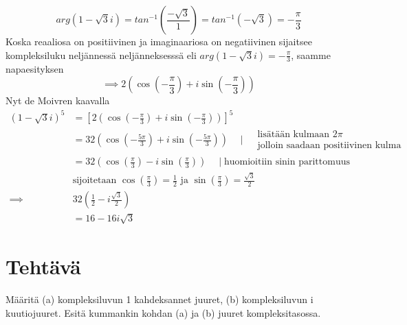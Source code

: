 \documentclass{article}
\newcounter{tehtava}
\begin{document}
\[
    arg(1 - \sqrt{3}i) = tan^{-1}\left(\frac{-\sqrt{3}}{1} \right) = tan^{-1}\left(-\sqrt{3} \right) = - \frac{\pi}{3}
\]
Koska reaaliosa on positiivinen ja imaginaariosa on negatiivinen sijaitsee kompleksiluku neljännessä neljänneksesssä eli $arg(1 - \sqrt{3}i) = - \frac{\pi}{3}$, saamme napaesityksen
\[
    \implies 2 \left( \cos\left( -\frac{\pi}{3} \right) + i \sin\left( -\frac{\pi}{3} \right) \right)
\]
Nyt de Moivren kaavalla
\[
\begin{aligned}
    (1 - \sqrt{3}i)^5 &= \left[2 \left( \cos\left( -\frac{\pi}{3} \right) + i \sin\left( -\frac{\pi}{3} \right) \right)\right]^5 \\
    &=32 \left( \cos\left( -\frac{5\pi}{3} \right) + i \sin\left( -\frac{5\pi}{3} \right) \right) \quad \mid \begin{aligned} &\text{lisätään kulmaan }2\pi \\&\text{jolloin saadaan positiivinen kulma} \end{aligned} \\
    &=32 \left( \cos\left( \frac{\pi}{3} \right) - i \sin\left( \frac{\pi}{3} \right) \right) \quad \mid \text{huomioitiin sinin parittomuus} \\
    &\text{sijoitetaan }
    \cos\left( \frac{\pi}{3} \right) = \frac{1}{2} \text{ ja } 
    \sin\left( \frac{\pi}{3} \right) = \frac{\sqrt{3}}{2} \\
    \implies 
    &32 \left( \frac{1}{2} - i \frac{\sqrt{3}}{2} \right)\\
    &= 16 - 16i\sqrt{3}
\end{aligned}
\]



\newpage
{}
\section*{Tehtävä \thetehtava}
Määritä \newline
(a) kompleksiluvun 1 kahdeksannet juuret, \newline
(b) kompleksiluvun i kuutiojuuret. \newline
Esitä kummankin kohdan (a) ja (b) juuret kompleksitasossa.
\end{document}
